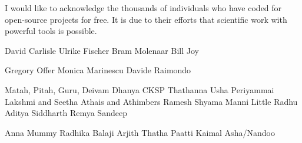 

\begin{acknowledgements}      %

I would like to acknowledge the thousands of individuals who have coded for open-source projects for free. It is due to their efforts that
scientific work with powerful tools is possible.


\end{acknowledgements}


David Carlisle
Ulrike Fischer
Bram Molenaar
Bill Joy


Gregory Offer
Monica Marinescu
Davide Raimondo

Matah, Pitah, Guru, Deivam
Dhanya
CKSP
Thathanna
Usha
Periyammai
Lakshmi and Seetha Athais and Athimbers
Ramesh
Shyama
Manni
Little Radhu
Aditya
Siddharth
Remya
Sandeep

Anna
Mummy
Radhika
Balaji
Arjith
Thatha
Paatti
Kaimal
Asha/Nandoo



